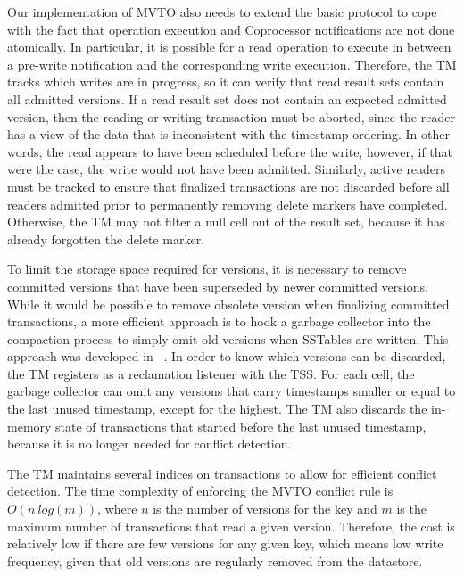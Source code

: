 \documentclass[10pt,final,journal]{IEEEtran}
\begin{document}
Our implementation of MVTO also needs to extend the basic protocol to cope with the fact that operation execution and Coprocessor notifications are not done atomically. In particular, it is possible for a read operation to execute in between a pre-write notification and the corresponding write execution. Therefore, the TM tracks which writes are in progress, so it can verify that read result sets contain all admitted versions. If a read result set does not contain an expected admitted version, then the reading or writing transaction must be aborted, since the reader has a view of the data that is inconsistent with the timestamp ordering. In other words, the read appears to have been scheduled before the write, however, if that were the case, the write would not have been admitted. Similarly, active readers must be tracked to ensure that finalized transactions are not discarded before all readers admitted prior to permanently removing delete markers have completed. Otherwise, the TM may not filter a null cell out of the result set, because it has already forgotten the delete marker.

To limit the storage space required for versions, it is necessary to remove committed versions that have been superseded by newer committed versions. While it would be possible to remove obsolete version when finalizing committed transactions, a more efficient approach is to hook a garbage collector into the compaction process to simply omit old versions when SSTables are written. This approach was developed in ~\cite{Junqueira:2011:LTS:2056318.2057148}. In order to know which versions can be discarded, the TM registers as a reclamation listener with the TSS. For each cell, the garbage collector can omit any versions that carry timestamps smaller or equal to the last unused timestamp, except for the highest. The TM also discards the in-memory state of transactions that started before the last unused timestamp, because it is no longer needed for conflict detection.

The TM maintains several indices on transactions to allow for efficient conflict detection. The time complexity of enforcing the MVTO conflict rule is $O(n \: log(m))$, where $n$ is the number of versions for the key and $m$ is the maximum number of transactions that read a given version. Therefore, the cost is relatively low if there are few versions for any given key, which means low write frequency, given that old versions are regularly removed from the datastore.
\end{document}
